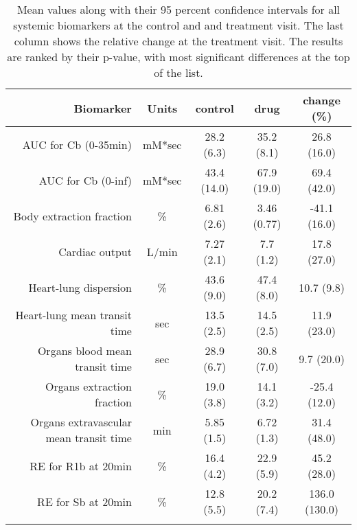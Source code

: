 \documentclass{epflreport}%
\begin{document}
\begin{longtable}{rcccc}%
\hline%
Biomarker&Units&control&drug&change (\%)\\%
\hline%
AUC for Cb (0{-}35min)&mM*sec&28.2 (6.3) &35.2 (8.1) &26.8 (16.0) \\%
AUC for Cb (0{-}inf)&mM*sec&43.4 (14.0) &67.9 (19.0) &69.4 (42.0) \\%
Body extraction fraction&\%&6.81 (2.6) &3.46 (0.77) &{-}41.1 (16.0) \\%
Cardiac output&L/min&7.27 (2.1) &7.7 (1.2) &17.8 (27.0) \\%
Heart{-}lung dispersion&\%&43.6 (9.0) &47.4 (8.0) &10.7 (9.8) \\%
Heart{-}lung mean transit time&sec&13.5 (2.5) &14.5 (2.5) &11.9 (23.0) \\%
Organs blood mean transit time&sec&28.9 (6.7) &30.8 (7.0) &9.7 (20.0) \\%
Organs extraction fraction&\%&19.0 (3.8) &14.1 (3.2) &{-}25.4 (12.0) \\%
Organs extravascular mean transit time&min&5.85 (1.5) &6.72 (1.3) &31.4 (48.0) \\%
RE for R1b at 20min&\%&16.4 (4.2) &22.9 (5.9) &45.2 (28.0) \\%
RE for Sb at 20min&\%&12.8 (5.5) &20.2 (7.4) &136.0 (130.0) \\%
\hline%
\caption{Mean values along with their 95 percent confidence intervals for all systemic biomarkers at the control and and treatment visit. The last column shows the relative change at the treatment visit. The results are ranked by their p-value, with most significant differences at the top of the list.} \\%
\end{longtable}%
\end{document}
